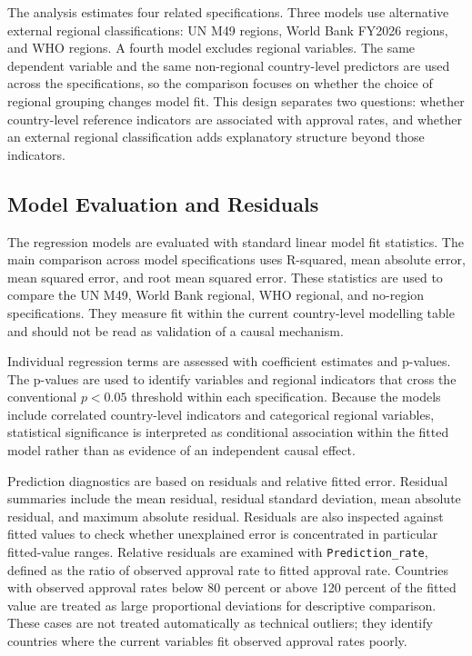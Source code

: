 \documentclass[runningheads]{llncs}
\begin{document}
The analysis estimates four related specifications. Three models use alternative external regional classifications: UN M49 regions, World Bank FY2026 regions, and WHO regions. A fourth model excludes regional variables. The same dependent variable and the same non-regional country-level predictors are used across the specifications, so the comparison focuses on whether the choice of regional grouping changes model fit. This design separates two questions: whether country-level reference indicators are associated with approval rates, and whether an external regional classification adds explanatory structure beyond those indicators.

\subsection{Model Evaluation and Residuals}

The regression models are evaluated with standard linear model fit statistics. The main comparison across model specifications uses R-squared, mean absolute error, mean squared error, and root mean squared error. These statistics are used to compare the UN M49, World Bank regional, WHO regional, and no-region specifications. They measure fit within the current country-level modelling table and should not be read as validation of a causal mechanism.

Individual regression terms are assessed with coefficient estimates and p-values. The p-values are used to identify variables and regional indicators that cross the conventional $p < 0.05$ threshold within each specification. Because the models include correlated country-level indicators and categorical regional variables, statistical significance is interpreted as conditional association within the fitted model rather than as evidence of an independent causal effect.

Prediction diagnostics are based on residuals and relative fitted error. Residual summaries include the mean residual, residual standard deviation, mean absolute residual, and maximum absolute residual. Residuals are also inspected against fitted values to check whether unexplained error is concentrated in particular fitted-value ranges. Relative residuals are examined with \texttt{Prediction\_rate}, defined as the ratio of observed approval rate to fitted approval rate. Countries with observed approval rates below 80 percent or above 120 percent of the fitted value are treated as large proportional deviations for descriptive comparison. These cases are not treated automatically as technical outliers; they identify countries where the current variables fit observed approval rates poorly.
\end{document}
